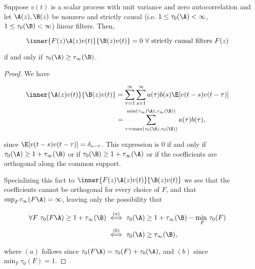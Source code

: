 \begin{lemma}
  \label{lem:time_lag_cancellation}
  Suppose $v(t)$ is a scalar process with unit variance and zero
  autocorrelation and let $\A(z), \B(z)$ be nonzero and strictly
  causal (i.e. $1 \le \tau_0(\A) < \infty$,
  $1 \le \tau_0(\B) < \infty$) linear filters.  Then,

  \begin{equation}
    \inner{F(z)\A(z)v(t)}{\B(z)v(t)} = 0\ \forall \text{ strictly causal filters } F(z)
  \end{equation}

  if and only if $\tau_0(\A) \ge \tau_\infty(\B)$.
\end{lemma}
\begin{proof}
  We have

  \begin{align}
    \inner{\A(z)v(t)}{\B(z)v(t)} &= \sum_{\tau = 1}^\infty \sum_{s = 1}^\infty a(\tau)b(s)\E[v(t - s)v(t - \tau)]\\
    &= \sum_{\tau = \text{max}(\tau_0(\A), \tau_0(\B))}^{\text{min}(\tau_\infty(\A), \tau_\infty(\B))} a(\tau) b(\tau),\\
  \end{align}

  since $\E[v(t - s)v(t - \tau)] = \delta_{s - \tau}$.  This expression is
  $0$ if and only if $\tau_0(\A) \ge 1 + \tau_\infty(\B)$ or if
  $\tau_0(\B) \ge 1 + \tau_\infty(\A)$ or if the coefficients are orthogonal along
  the common support.

  Specializing this fact to $\inner{F(z)\A(z)v(t)}{\B(z)v(t)}$ we
  see that the coefficients cannot be orthogonal for every choice of
  $F$, and that $\text{sup}_F \tau_\infty(F\A) = \infty$, leaving only
  the possibility that

  \begin{align*}
     \forall F\ \tau_0(F\A) \ge 1 + \tau_\infty(\B) &\overset{(a)}{\iff} \tau_0(\A) \ge 1 + \tau_\infty(\B) - \underset{F}{\text{min }} \tau_0(F)\\
    &\overset{(b)}{\iff} \tau_0(\A) \ge \tau_\infty(\B),
  \end{align*}

  where $(a)$ follows since $\tau_0(F\A) = \tau_0(F) + \tau_0(\A)$,
  and $(b)$ since $\text{min}_F\ \tau_0(F) = 1$.
\end{proof}

